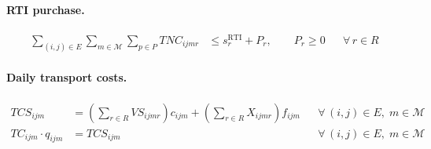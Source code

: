 \begin{ChapterAppendix}
\paragraph{RTI purchase.}
\begin{align}
  \sum_{(i,j)\in E} \sum_{m\in\mathcal{M}} \sum_{p\in P} TNC_{ijmr} &\leq s^{\text{RTI}}_{r} + P_{r}, \qquad P_{r}\geq 0
  && \forall\,r\in R
\end{align}

\paragraph{Daily transport costs.}
\begin{align}
  TCS_{ijm} &= \left(\sum_{r\in R} VS_{ijmr}\right) c_{ijm} + \left(\sum_{r\in R} X_{ijmr}\right) f_{ijm}
  && \forall\,(i,j)\in E,\;m\in\mathcal{M} \\
  TC_{ijm}\cdot q_{ijm} &= TCS_{ijm}
  && \forall\,(i,j)\in E,\;m\in\mathcal{M}
\end{align}



\end{ChapterAppendix}
